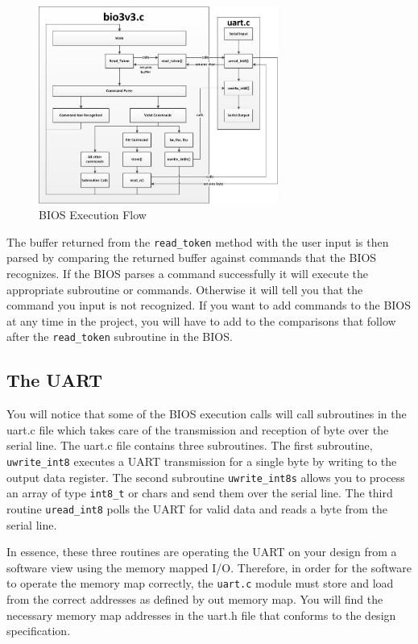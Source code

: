 \documentclass[11pt]{article}
\begin{document}
\begin{figure}[H]
  \centering
  \includegraphics[width=0.7\textwidth]{bios_flow.png}
  \caption{BIOS Execution Flow}
\end{figure}

The buffer returned from the \verb|read_token| method with the user input is then parsed by
comparing the returned buffer against commands that the BIOS recognizes. If the BIOS parses a
command successfully it will execute the appropriate subroutine or commands. Otherwise it
will tell you that the command you input is not recognized.
If you want to add commands to the BIOS at any time in the project, you will have to add to the
comparisons that follow after the \verb|read_token| subroutine in the BIOS.

\subsection{The UART}
You will notice that some of the BIOS execution calls will call subroutines in the uart.c file
which takes care of the transmission and reception of byte over the serial line.
The uart.c file contains three subroutines. The first subroutine, \verb|uwrite_int8| executes a
UART transmission for a single byte by writing to the output data register. The second
subroutine \verb|uwrite_int8s| allows you to process an array of type \verb|int8_t| or chars and send
them over the serial line. The third routine \verb|uread_int8| polls the UART for valid data and
reads a byte from the serial line.

In essence, these three routines are operating the UART on your design from a software view
using the memory mapped I/O. Therefore, in order for the software to operate the memory
map correctly, the \verb|uart.c| module must store and load from the correct addresses as defined
by out memory map. You will find the necessary memory map addresses in the uart.h file that
conforms to the design specification.
\end{document}
